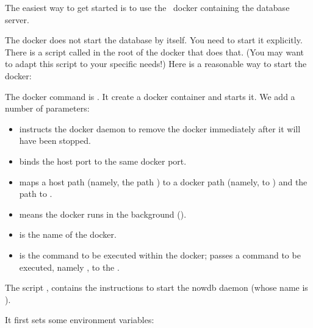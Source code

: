 The easiest way to get started
is to use the \nowdb\ docker containing
the database server.


The docker does not start the database by itself.
You need to start it explicitly. There is a script
called  in the root of the docker
that does that.
(You may want to adapt this script to your specific needs!)
Here is a reasonable way to start the docker:


The docker command is .
It create a docker container and starts it.
We add a number of parameters:
\begin{itemize}
\item {}
instructs the docker daemon to remove
the docker immediately after it will have been stopped.

\item {} binds the host port 
to the same docker port.

\item {} maps a host path
(namely, the path ) to a docker path
(namely, to ) and
the path  to .

\item {} means the docker runs in the background
().

\item {} is the name of the docker.

\item {} is the command to be executed
within the docker;  passes a command
to be executed,
namely ,
to the .
\end{itemize}

The script , contains the
instructions to start the nowdb daemon (whose name is
).

It first sets some environment variables:



